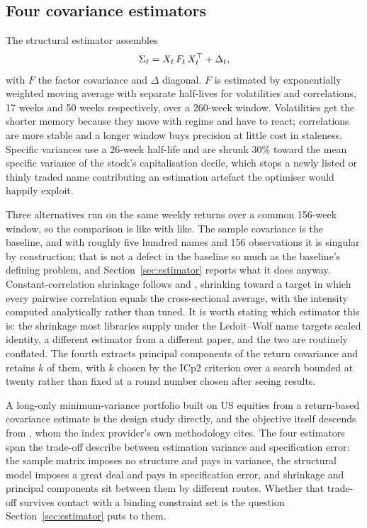 \subsection{Four covariance estimators}
The structural estimator assembles
\begin{equation}
 \Sigma_t = X_{t}\,F_{t}\,X_{t}^{\top} + \Delta_{t},
 \label{eq:structural}
\end{equation}
with $F$ the factor covariance and $\Delta$ diagonal. $F$ is estimated by
exponentially weighted moving average with separate half-lives for volatilities
and correlations, 17 weeks and 50 weeks respectively, over a 260-week window.
Volatilities get the shorter memory because they move with regime and have to
react; correlations are more stable and a longer window buys precision at
little cost in staleness. Specific variances use a 26-week half-life and are
shrunk 30\% toward the mean specific variance of the stock's
capitalisation decile, which stops a newly listed or thinly traded name
contributing an estimation artefact the optimiser would happily exploit.

Three alternatives run on the same weekly returns over a common 156-week
window, so the comparison is like with like. The sample covariance is the
baseline, and with roughly five hundred names and 156 observations it is
singular by construction; that is not a defect in the baseline so much as the
baseline's defining problem, and Section~\ref{sec:estimator} reports what it
does anyway. Constant-correlation shrinkage follows
\citet{ledoit2003improved} and \citet{ledoit2004honey}, shrinking toward a
target in which every pairwise correlation equals the cross-sectional average,
with the intensity computed analytically rather than tuned. It is worth
stating which estimator this is: the shrinkage most libraries supply under the
Ledoit--Wolf name targets scaled identity, a different estimator from a
different paper, and the two are routinely conflated. The fourth extracts
principal components of the return covariance and retains $k$ of them, with $k$
chosen by the \citet{bai2002determining} ICp2 criterion over a search bounded
at twenty rather than fixed at a round number chosen after seeing results.

A long-only minimum-variance portfolio built on US equities from a return-based
covariance estimate is the design \citet{clarke2006minimum} study directly, and
the objective itself descends from \citet{markowitz1952portfolio}, whom the
index provider's own methodology cites. The four estimators span the trade-off
\citet{briner2008howmuch} describe between
estimation variance and specification error: the sample matrix imposes no
structure and pays in variance, the structural model imposes a great deal and
pays in specification error, and shrinkage and principal components sit between
them by different routes. Whether that trade-off survives contact with a
binding constraint set is the question Section~\ref{sec:estimator} puts to
them.
